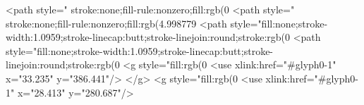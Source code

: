 <path style=" stroke:none;fill-rule:nonzero;fill:rgb(0%
<path style=" stroke:none;fill-rule:nonzero;fill:rgb(4.998779%
<path style="fill:none;stroke-width:1.0959;stroke-linecap:butt;stroke-linejoin:round;stroke:rgb(0%
<path style="fill:none;stroke-width:1.0959;stroke-linecap:butt;stroke-linejoin:round;stroke:rgb(0%
<g style="fill:rgb(0%
  <use xlink:href="#glyph0-1" x="33.235" y="386.441"/>
</g>
<g style="fill:rgb(0%
  <use xlink:href="#glyph0-1" x="28.413" y="280.687"/>
